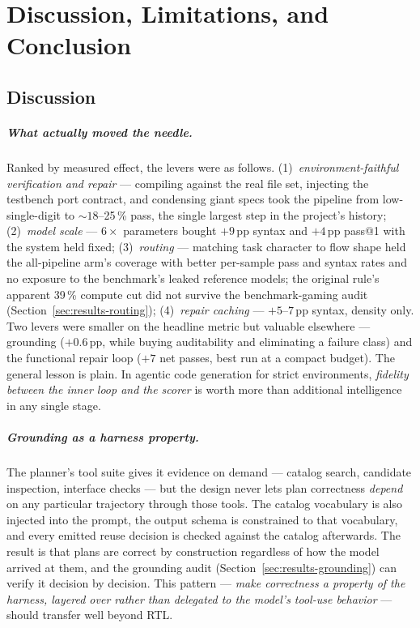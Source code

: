 
\chapter{Discussion, Limitations, and Conclusion}
\label{ch:07}

\section{Discussion}
\label{sec:discussion}

\paragraph{What actually moved the needle.}
Ranked by measured effect, the levers were as follows. (1)~\emph{environment-faithful
verification and repair} --- compiling against the real file set,
injecting the testbench port contract, and condensing giant specs took the
pipeline from low-single-digit to ${\sim}18$--25\,\% pass, the single
largest step in the project's history; (2)~\emph{model scale} ---
$6\times$ parameters bought $+9$\,pp syntax and $+4$\,pp pass@1 with the
system held fixed; (3)~\emph{routing} --- matching task character to
flow shape held the all-pipeline arm's coverage with better per-sample
pass and syntax rates and no exposure to the benchmark's leaked
reference models; the original rule's apparent 39\,\% compute cut did
not survive the benchmark-gaming audit
(Section~\ref{sec:results-routing}); (4)~\emph{repair caching} ---
$+5$--$7$\,pp syntax, density only. Two levers were smaller on the
headline metric but valuable elsewhere --- grounding ($+0.6$\,pp, while
buying auditability and eliminating a failure class) and the functional
repair loop ($+7$ net passes, best run at a compact budget). The
general lesson is plain. In agentic code generation for strict
environments, \emph{fidelity between the inner loop and the scorer} is
worth more than additional intelligence in any single stage.

\paragraph{Grounding as a harness property.}
The planner's tool suite gives it evidence on demand --- catalog search,
candidate inspection, interface checks --- but the design never lets
plan correctness \emph{depend} on any particular trajectory through
those tools. The catalog vocabulary is also injected into the prompt,
the output schema is constrained to that vocabulary, and every emitted
reuse decision is checked against the catalog afterwards. The result is
that plans are correct by construction regardless of how the model
arrived at them, and the grounding audit
(Section~\ref{sec:results-grounding}) can verify it decision by
decision. This pattern --- \emph{make correctness a property
of the harness, layered over rather than delegated to the model's
tool-use behavior} --- should transfer well beyond RTL.

